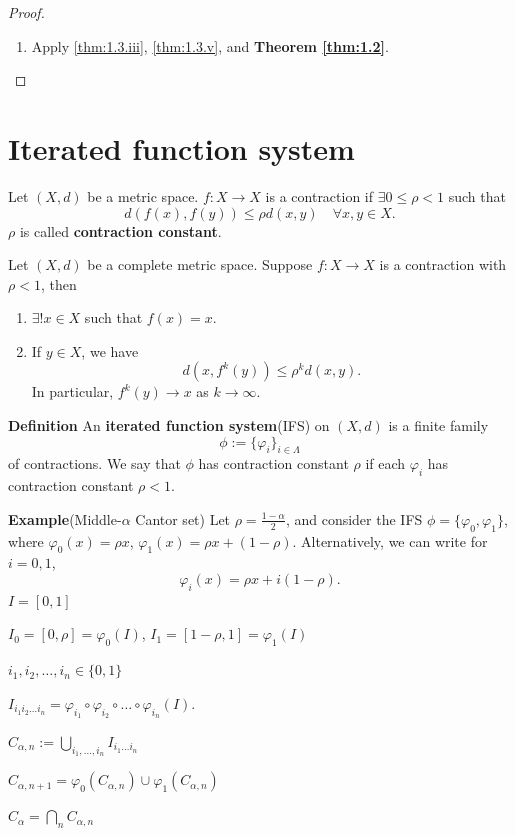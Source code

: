 \begin{proof}
\begin{enumerate}[label=(\roman*)]
    \item Apply \ref{thm:1.3.iii}, \ref{thm:1.3.v}, and \textbf{Theorem \ref{thm:1.2}}.\qedhere
\end{enumerate}
\end{proof}

\section{Iterated function system}
Let $(X,d)$ be a metric space. $f:X\to X$ is a contraction if $\exists 0\leq \rho< 1$ such that
\[
d(f(x),f(y))\leq \rho d(x,y)\quad \forall x,y \in X.
\]
$\rho$ is called \textbf{contraction constant}.

\begin{theorem}\label{thm:2.1}
Let $(X,d)$ be a complete metric space. Suppose $f:X\to X$ is a contraction with $\rho<1$, then
\begin{enumerate}[label=(\roman*)]
    \item $\exists! x \in X$ such that $f(x)=x$.
    \item If $y \in X$, we have \[d(x,f^{k}(y))\leq \rho ^{k}d(x,y).\]In particular, $f^{k}(y)\to x$ as $k\to \infty$.
\end{enumerate}
\end{theorem}

\textbf{Definition} An \textbf{iterated function system}(IFS) on $(X,d)$ is a finite family
\[
\phi:= \{ \varphi _{i} \}_{i \in \Lambda}
\]
of contractions. We say that $\phi$ has contraction constant $\rho$ if each $\varphi _{i}$ has contraction constant $\rho<1$.

\textbf{Example}(Middle-$\alpha$ Cantor set) Let $\rho= \frac{1-\alpha}{2}$, and consider the IFS $\phi = \{ \varphi_{0},\varphi_{1} \}$, where $\varphi_{0}(x)=\rho x$, $\varphi_{1}(x)=\rho x + (1-\rho)$. Alternatively, we can write for $i=0,1$,
\[
\varphi _{i}(x)=\rho x+i(1-\rho).
\]
$I=[0,1]$

$I_{0}=[0,\rho]=\varphi_{0}(I)$, $I_{1}=[1-\rho,1]=\varphi_{1}(I)$

$i_{1},i_{2},\dots,i_{n}\in \{ 0,1 \}$

$I_{i_{1}i_{2}\dots i_{n}}=\varphi _{i_{1}}\circ \varphi _{i_2}\circ\dots\circ \varphi _{i_{n}}(I)$.

$\displaystyle C_{\alpha,n}:= \bigcup _{i_{1},\dots,i_{n}}I_{i_{1}\dots i_{n}}$

$C_{\alpha,n+1}=\varphi_{0}(C_{\alpha,n})\cup \varphi_{1}(C_{\alpha,n})$

$\displaystyle C_{\alpha}=\bigcap _{n}C_{\alpha,n}$

